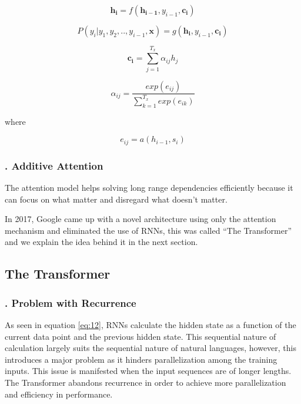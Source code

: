 \begin{equation}
\label{eq:16}
\mathbf{h_i} = f(\mathbf{h_{i-1}}, y_{i-1}, \mathbf{c_i})
\end{equation}

\begin{equation}
\label{eq:17}
P(y_i | y_1, y_2,.., y_{i-1}, \mathbf{x}) = g(\mathbf{h_{i}}, y_{i-1}, \mathbf{c_i})
\end{equation}

\begin{equation}
\label{eq:18}
\mathbf{c_i} = \sum_{j=1}^{T_x} \alpha_{ij} h_j
\end{equation}

\begin{equation}
\label{eq:19}
\alpha_{ij} = \frac{ exp(e_{ij}) }{ \sum_{k=1}^{T_x} exp(e_{ik}) }
\end{equation}

where 


\begin{equation}
\label{eq:20}
e_{ij} = a(h_{i-1}, s_i)
\end{equation}

\subsubsection{. Additive Attention} 
\label{bg:subsub100}


The attention model helps solving long range dependencies efficiently because it can focus on what matter and disregard what doesn't matter. 

In 2017, Google came up with a novel architecture using only the attention mechanism and eliminated the use of \ac{RNN}s, this was called \enquote{The Transformer} and we explain the idea behind it in the next section.

\subsection{The Transformer} 
\label{bg:sub10}

\subsubsection{. Problem with Recurrence} 
\label{bg:subsub11}
As seen in equation \ref{eq:12}, \ac{RNNs} calculate the hidden state as a function of the current data point and the previous hidden state. This sequential nature of calculation largely suits the sequential nature of natural languages, however, this introduces a major problem as it hinders parallelization among the training inputs. This issue is manifested when the input sequences are of longer lengths. The Transformer abandons recurrence in order to achieve more parallelization and efficiency in performance.

